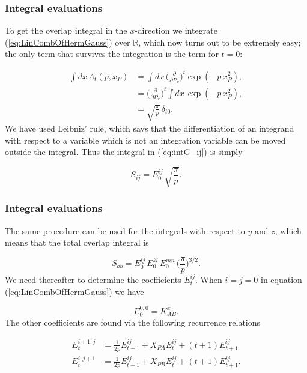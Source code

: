 \documentclass{beamer}
\begin{document}
\begin{frame}
\frametitle{Integral evaluations}

\begin{block}{}

To get the overlap integral in the $x$-direction we integrate (\ref{eq:LinCombOfHermGauss}) over $\mathbb{R}$, which now turns out to be extremely easy;
the only term that survives the integration is the term for $t=0$:

\begin{align}
 \int dx\,\Lambda_t(p,x_P) & =  \int dx\,\Big(\frac{\partial}{\partial P_x}\Big)^t\exp(-p\,x^2_P), \\
                           & =  \Big(\frac{\partial}{\partial P_x}\Big)^t \int dx\,\exp(-p\,x^2_P), \\
                           & =  \sqrt{\frac{\pi}{p}}\,\delta_{t0}.
\end{align}
We have used Leibniz' rule, which says that the differentiation of an integrand with respect to a variable which is not an integration variable can
be moved outside the integral. Thus the integral in (\ref{eq:intG_ij}) is simply

\begin{equation}
 S_{ij} = E^{ij}_0\,\sqrt{\frac{\pi}{p}}.
\end{equation}
\end{block}
\end{frame}

\begin{frame}
\frametitle{Integral evaluations}

\begin{block}{}

The same procedure can be used for the integrals with respect to $y$ and $z$, which means that the total overlap integral is

\begin{equation}
 S_{ab} = E^{ij}_0\,E^{kl}_0\,E^{mn}_0\,\Big(\frac{\pi}{p}\Big)^{3/2}.
\end{equation}
We need thereafter to determine the coefficients $E^{ij}_t$. When $i=j=0$ in equation (\ref{eq:LinCombOfHermGauss})
we have

\begin{equation}
 E^{0,0}_0 = K_{AB}^x.
\end{equation}
The other coefficients are found via the following recurrence relations

\begin{equation}
\label{eq:E_recurrence}
\begin{split}
 E^{i+1,j}_t & = \frac{1}{2p}E^{ij}_{t-1} + X_{PA}E^{ij}_t + (t+1)E^{ij}_{t+1} \\
 E^{i,j+1}_t & = \frac{1}{2p}E^{ij}_{t-1} + X_{PB}E^{ij}_t + (t+1)E^{ij}_{t+1}.
\end{split}
\end{equation}
\end{block}
\end{frame}
\end{document}
